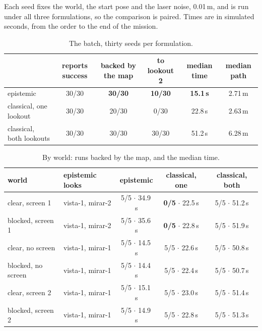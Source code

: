 \documentclass[11pt,a4paper]{article}
\theoremstyle{definition}
\newcommand{\act}[1]{\textsf{#1}}
\begin{document}
Each seed fixes the world, the start pose and the laser noise, 0.01\,m, and is
run under all three formulations, so the comparison is paired. Times are in
simulated seconds, from the order to the end of the mission.

\begin{table}[H]
\centering
\footnotesize
\begin{tabular}{@{}lccccc@{}}
\toprule
& reports success & backed by the map & to lookout 2 & median time & median path \\
\midrule
epistemic & 30/30 & \textbf{30/30} & \textbf{10/30} & \textbf{15.1\,s} & 2.71\,m \\
classical, one lookout & 30/30 & 20/30 & 0/30 & 22.8\,s & 2.63\,m \\
classical, both lookouts & 30/30 & 30/30 & 30/30 & 51.2\,s & 6.28\,m \\
\bottomrule
\end{tabular}
\caption{The batch, thirty seeds per formulation.}
\end{table}

\begin{table}[H]
\centering
\small
\begin{tabular}{@{}llccc@{}}
\toprule
world & epistemic looks & epistemic & classical, one & classical, both \\
\midrule
clear, screen 1 & \act{vista-1}, \act{mirar-2} & 5/5 $\cdot$ 34.9\,s & \textbf{0/5} $\cdot$ 22.5\,s & 5/5 $\cdot$ 51.2\,s \\
blocked, screen 1 & \act{vista-1}, \act{mirar-2} & 5/5 $\cdot$ 35.6\,s & \textbf{0/5} $\cdot$ 22.8\,s & 5/5 $\cdot$ 51.9\,s \\
clear, no screen & \act{vista-1}, \act{mirar-1} & 5/5 $\cdot$ 14.5\,s & 5/5 $\cdot$ 22.6\,s & 5/5 $\cdot$ 50.8\,s \\
blocked, no screen & \act{vista-1}, \act{mirar-1} & 5/5 $\cdot$ 14.4\,s & 5/5 $\cdot$ 22.4\,s & 5/5 $\cdot$ 50.7\,s \\
clear, screen 2 & \act{vista-1}, \act{mirar-1} & 5/5 $\cdot$ 15.1\,s & 5/5 $\cdot$ 23.0\,s & 5/5 $\cdot$ 51.4\,s \\
blocked, screen 2 & \act{vista-1}, \act{mirar-1} & 5/5 $\cdot$ 14.9\,s & 5/5 $\cdot$ 22.8\,s & 5/5 $\cdot$ 51.3\,s \\
\bottomrule
\end{tabular}
\caption{By world: runs backed by the map, and the median time.}
\end{table}
\end{document}
